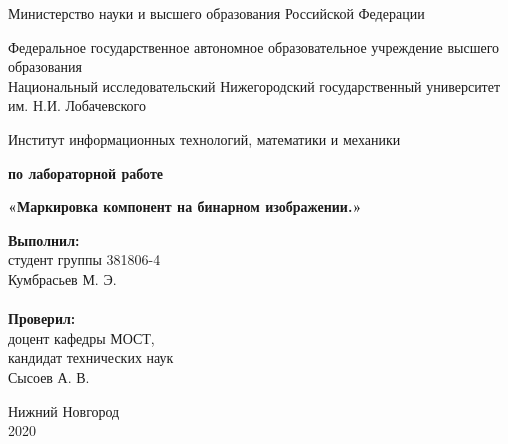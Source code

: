 \documentclass{report}
\begin{document}
\begin{titlepage}

\begin{center}
Министерство науки и высшего образования Российской Федерации
\end{center}

\begin{center}
Федеральное государственное автономное образовательное учреждение высшего образования \\
Национальный исследовательский Нижегородский государственный университет им. Н.И. Лобачевского
\end{center}

\begin{center}
Институт информационных технологий, математики и механики
\end{center}

\vspace{4em}

\begin{center}
\textbf{ по лабораторной работе} \\
\end{center}
\begin{center}
\textbf{\Large «Маркировка компонент на бинарном изображении.»}
\vspace{4em}
\end{center}
\newbox{\lbox}
\newlength{\maxl}
\setlength{\maxl}{\wd\lbox}
\hfill\parbox{7cm}{
\hspace*{5cm}\hspace*{-5cm}\textbf{Выполнил:} \\ студент группы 381806-4 \\ Кумбрасьев М. Э.\\
\\
\hspace*{5cm}\hspace*{-5cm}\textbf{Проверил:}\\ доцент кафедры МОСТ, \\ кандидат технических наук \\ Сысоев А. В.\\
}
\vspace{\fill}

\begin{center} Нижний Новгород \\ 2020 \end{center}

\end{titlepage}
\end{document}
